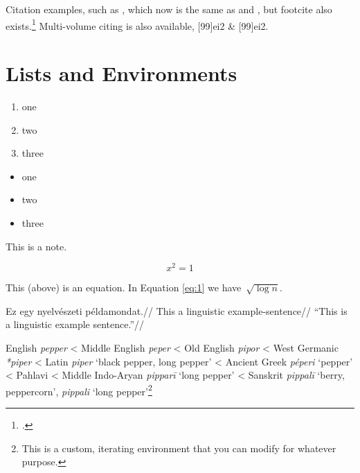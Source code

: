 Citation examples, such as \autocite[99]{laufer_sino-iranica_1919}, which now is the same as \parencite[99]{laufer_sino-iranica_1919} and \textcite{laufer_sino-iranica_1919}, but footcite also exists.\footcite{laufer_sino-iranica_1919} 
Multi-volume citing is also available, [99]{ei2} \& [99]{ei2}.

\section{Lists and Environments}
\label{sec:environments}

\begin{enumerate}
    \item one
    \item two
    \item three
\end{enumerate}

\begin{itemize}
    \item one
    \item two
    \item three
\end{itemize}

\begin{note}
    This is a note.
\end{note}

\begin{equation}
    \label{eq:1}
    x^2  = 1
\end{equation}

This (above) is an equation. In Equation \ref{eq:1} we have~$\sqrt{\log n}$.

\ex
\begingl
\gla{}Ez egy nyelvészeti példamondat.//
\glb This a linguistic example-sentence//
\glft ``This is a linguistic example sentence.''//
\endgl
\xe

\begin{etymology}\label{etym:pepper}
\raggedright
English \textit{pepper}
< Middle English \textit{peper}
< Old English \textit{pipor}
< West Germanic \textit{*piper}
< Latin \textit{piper} `black pepper, long pepper'
< Ancient Greek \textit{péperi} `pepper'
< Pahlavi
< Middle Indo-Aryan \textit{pipparī} `long pepper'
< Sanskrit \textit{pippalī} `berry, peppercorn', \textit{pippali} `long pepper'\footnote{This is a custom, iterating environment that you can modify for whatever purpose.}
\end{etymology}

